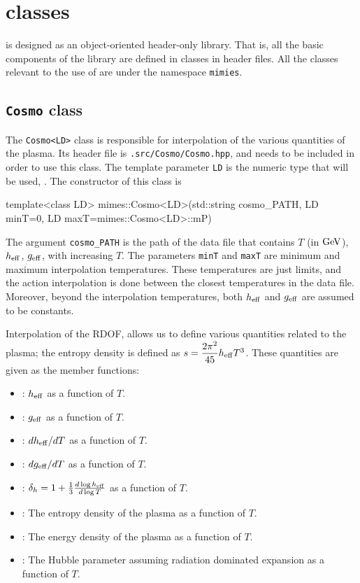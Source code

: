 \documentclass[11pt,a4paper]{article}
\begin{document}
\section{\CPP classes}\label{app:classes}
\setcounter{equation}{0}
%
\mimes is designed as an object-oriented header-only library. That is, all the basic components of the library are defined in classes in header files. All the classes relevant to the use of \mimes are under the namespace {\tt mimies}.

\subsection{{\tt Cosmo} class}
%
The {\tt Cosmo<LD>} class is responsible for interpolation of the various quantities of the plasma. Its header file is {\tt \mimes.src/Cosmo/Cosmo.hpp}, and needs to be included in order to use this class. The template parameter {\tt LD} is the numeric type that will be used, . The constructor of this class is
%
\begin{cpp}
	template<class LD>
	mimes::Cosmo<LD>(std::string cosmo_PATH, LD minT=0, LD maxT=mimes::Cosmo<LD>::mP)
\end{cpp}
%
The argument {\tt cosmo\_PATH} is the path of the data file that contains $T$ (in ${\rm GeV}$), $h_{\rm eff}{}$, $g_{\rm eff}{}$, with increasing $T$. The parameters {\tt minT} and {\tt maxT} are minimum and maximum interpolation temperatures. These temperatures are just limits, and the action interpolation is done between the closest temperatures in the data file. Moreover, beyond the interpolation temperatures, both $h_{\rm eff}{}$ and $g_{\rm eff}{}$ are assumed to be constants.

Interpolation of the RDOF, allows us to define various quantities related to the plasma; \eg the entropy density is defined as $s = \dfrac{2\pi^2}{45} h_{\rm eff}{} T^3$. These quantities are given as the member functions:
%
\begin{itemize}
	\item {}: $h_{\rm eff}{}$ as a function of $T$.
	\item {}: $g_{\rm eff}{}$ as a function of $T$.
	\item {}: $dh_{\rm eff}{}/dT$ as a function of $T$.
	\item {}: $dg_{\rm eff}{}/dT$ as a function of $T$.
	\item {}: $\delta_h = 1 + \frac{1}{3} \frac{d\log h_{\rm eff}{}}{d\log T}$ as a function of $T$.
	\item {}: The entropy density of the plasma as a function of $T$.
	\item {}: The energy density of the plasma as a function of $T$.
	\item {}: The Hubble parameter assuming radiation dominated expansion as a function of $T$.
\end{itemize}
\end{document}
